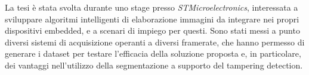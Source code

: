 La tesi \`e stata svolta durante uno stage presso \textit{STMicroelectronics}, interessata a sviluppare algoritmi intelligenti di elaborazione immagini da integrare nei propri dispositivi embedded, e a scenari di impiego per questi.
Sono stati messi a punto diversi sistemi di acquisizione operanti a diversi framerate, che hanno permesso di generare i dataset per testare l'efficacia della soluzione proposta e, in particolare, dei vantaggi nell'utilizzo della segmentazione a supporto del tampering detection. 
